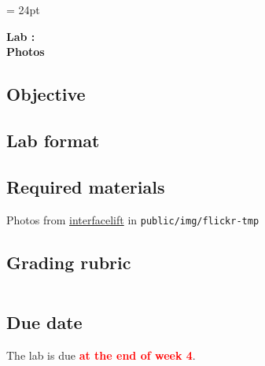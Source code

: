 \documentclass{article}
\newcommand{\labduedate}{at the end of week 4}
\begin{document}
\chead{\textcolor{Gray}{CSSE491 -- Scalable Computing Lab Assignment}}
\headsep = 24pt

\begin{center}
{ \large
\textbf{Lab \labnumber: \longproductname} \\
\textbf{Photos}
}
\end{center}

\subsection*{Objective}

\subsection*{Lab format}

\subsection*{Required materials}
Photos from \href{http://interfacelift.com}{interfacelift} in \verb!public/img/flickr-tmp!

\subsection*{Grading rubric}
\begin{tabular}{p{5.5in} r}
\end{tabular}

\subsection*{Due date}
The lab is due \textcolor{red}{\textbf{\labduedate}}.




\end{document}
